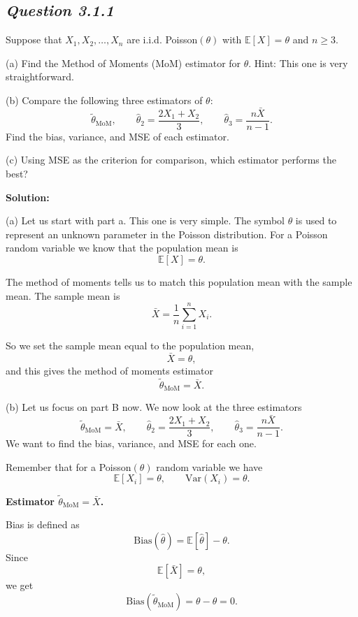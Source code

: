 \documentclass[11pt,letterpaper]{article}
\theoremstyle{remark}
\begin{document}
\subsection*{\textit{Question 3.1.1}}

Suppose that $X_1, X_2, \dots, X_n$ are i.i.d. Poisson$(\theta)$ with $\mathbb{E}[X] = \theta$ and $n \ge 3$.

(a) Find the Method of Moments (MoM) estimator for $\theta$.
Hint: This one is very straightforward.

(b) Compare the following three estimators of $\theta$:
\[
\tilde{\theta}_{\mathrm{MoM}},
\qquad
\hat{\theta}_2 = \frac{2X_1 + X_2}{3},
\qquad
\hat{\theta}_3 = \frac{n\bar{X}}{n - 1}.
\]
Find the bias, variance, and MSE of each estimator.

(c) Using MSE as the criterion for comparison, which estimator performs the best?

\vspace{1cm}

\textbf{Solution:}

(a) Let us start with part a. This one is very simple. The symbol $\theta$ is used to represent an unknown parameter in the Poisson distribution. For a Poisson random variable we know that the population mean is
\[
\mathbb{E}[X] = \theta.
\]

The method of moments tells us to match this population mean with the sample mean. The sample mean is
\[
\bar{X} = \frac{1}{n}\sum_{i=1}^n X_i.
\]

So we set the sample mean equal to the population mean,
\[
\bar{X} = \theta,
\]
and this gives the method of moments estimator
\[
\boxed{\tilde{\theta}_{\text{MoM}} = \bar{X}.}
\]

\vspace{1cm}

(b) Let us focus on part B now. We now look at the three estimators
\[
\tilde{\theta}_{\text{MoM}} = \bar{X}, \qquad
\hat{\theta}_2 = \frac{2X_1 + X_2}{3}, \qquad
\hat{\theta}_3 = \frac{n\bar{X}}{n - 1}.
\]
We want to find the bias, variance, and MSE for each one.

Remember that for a Poisson$(\theta)$ random variable we have
\[
\mathbb{E}[X_i] = \theta, \qquad \mathrm{Var}(X_i) = \theta.
\]

\medskip
\noindent
\textbf{Estimator $\tilde{\theta}_{\text{MoM}} = \bar{X}$.}

Bias is defined as
\[
\mathrm{Bias}(\hat{\theta}) = \mathbb{E}[\hat{\theta}] - \theta.
\]
Since
\[
\mathbb{E}[\bar{X}] = \theta,
\]
we get
\[
\mathrm{Bias}(\tilde{\theta}_{\text{MoM}}) = \theta - \theta = 0.
\]
\end{document}
